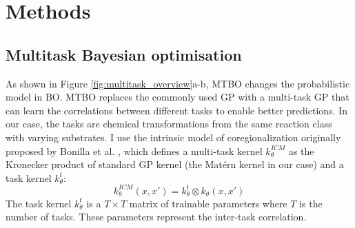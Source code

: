 \section{Methods}

\subsection{Multitask Bayesian optimisation}

As shown in Figure \ref{fig:multitask_overview}a-b, MTBO changes the probabilistic model in BO.  MTBO replaces the commonly used GP with a multi-task GP that can learn the correlations between different tasks to enable better predictions. In our case, the tasks are chemical transformations from the same reaction class with varying substrates. I use the intrinsic model of coregionalization originally proposed by Bonilla et al. \cite{Bonilla2007}, which defines a multi-task kernel $k^{ICM}_{\theta}$ as the Kronecker product of standard GP kernel (the Matérn kernel in our case) and a task kernel $k^t_{\theta}$:
\begin{equation}
    k^{ICM}_{\theta}(x,x') = k^t_{\theta} \otimes  k_{\theta}(x,x')
\end{equation}
The task kernel $k^t_{\theta}$ is a $T \times T$ matrix of trainable parameters where $T$ is the number of tasks. These parameters represent the inter-task correlation.

